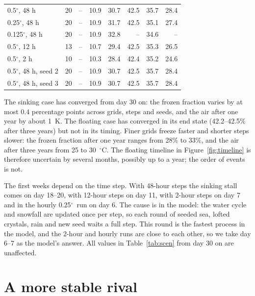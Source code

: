 \documentclass[11pt,a4paper]{article}
\newcommand{\degC}{$^{\circ}$C}
\newcommand{\degree}{$^{\circ}$}
\begin{document}
\begin{table}[htbp]
\begin{tabular}{lrrrrrrr}
0.5\degree, 48 h & 20 & -- & 10.9 & 30.7 & 42.5 & 35.7 & 28.4 \\
0.25\degree, 48 h & 20 & -- & 10.9 & 31.7 & 42.5 & 35.1 & 27.4 \\
0.125\degree, 48 h & 20 & -- & 10.9 & 32.8 & -- & 34.6 & -- \\
0.5\degree, 12 h & 13 & -- & 10.7 & 29.4 & 42.5 & 35.3 & 26.5 \\
0.5\degree, 2 h & 10 & -- & 10.3 & 28.4 & 42.4 & 35.2 & 24.6 \\
0.5\degree, 48 h, seed 2 & 20 & -- & 10.9 & 30.7 & 42.5 & 35.7 & 28.4 \\
0.5\degree, 48 h, seed 3 & 20 & -- & 10.9 & 30.7 & 42.5 & 35.7 & 28.4 \\
\bottomrule
\end{tabular}
\end{table}

The sinking case has converged from day 30 on: the frozen fraction varies by at most 0.4 percentage points across grids, steps and seeds, and the air after one year by about 1~K. The floating case has converged in its end state (42.2--42.5\% after three years) but not in its timing. Finer grids freeze faster and shorter steps slower: the frozen fraction after one year ranges from 28\% to 33\%, and the air after three years from 25 to 30~\degC. The floating timeline in Figure~\ref{fig:timeline} is therefore uncertain by several months, possibly up to a year; the order of events is not.

The first weeks depend on the time step. With 48-hour steps the sinking stall comes on day 18--20, with 12-hour steps on day 11, with 2-hour steps on day 7 and in the hourly 0.25\degree\ run on day 6. The cause is in the model: the water cycle and snowfall are updated once per step, so each round of seeded sea, lofted crystals, rain and new seed waits a full step. This round is the fastest process in the model, and the 2-hour and hourly runs are close to each other, so we take day 6--7 as the model's answer. All values in Table~\ref{tab:scen} from day 30 on are unaffected.

\section{A more stable rival}
\label{sec:poly}
\end{document}
